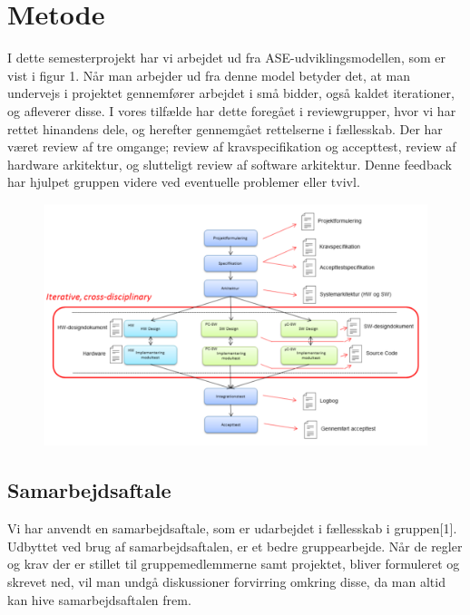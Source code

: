 \section{Metode}
I dette semesterprojekt har vi arbejdet ud fra ASE-udviklingsmodellen, som er vist i figur 1. Når man arbejder ud fra denne model betyder det, at man undervejs i projektet gennemfører arbejdet i små bidder, også kaldet iterationer, og afleverer disse. I vores tilfælde har dette foregået i reviewgrupper, hvor vi har rettet hinandens dele, og herefter gennemgået rettelserne i fællesskab.
Der har været review af tre omgange; review af kravspecifikation og accepttest, review af hardware arkitektur, og slutteligt review af software arkitektur. Denne feedback har hjulpet gruppen videre ved eventuelle problemer eller tvivl.  

	\begin{figure}[h!]
	\centering
	\includegraphics[width=0.8\linewidth]{Udviklingsproces/ASEmodellen}
\end{figure}

\subsection{Samarbejdsaftale}
Vi har anvendt en samarbejdsaftale, som er udarbejdet i fællesskab i gruppen[1]. Udbyttet ved brug af samarbejdsaftalen, er et bedre gruppearbejde. Når de regler og krav der er stillet til gruppemedlemmerne samt projektet, bliver formuleret og skrevet ned, vil man undgå diskussioner forvirring omkring disse, da man altid kan hive samarbejdsaftalen frem.

